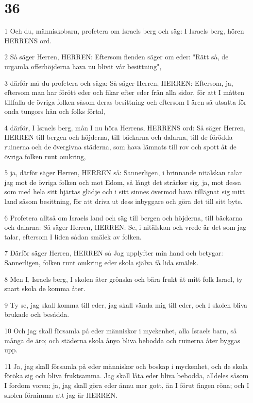 \chapter{36}

\par 1 Och du, människobarn, profetera om Israels berg och säg: I Israels berg, hören HERRENS ord.
\par 2 Så säger Herren, HERREN: Eftersom fienden säger om eder: "Rätt så, de urgamla offerhöjderna hava nu blivit vår besittning",
\par 3 därför må du profetera och säga: Så säger Herren, HERREN: Eftersom, ja, eftersom man har förött eder och fikar efter eder från alla sidor, för att I måtten tillfalla de övriga folken såsom deras besittning och eftersom I ären så utsatta för onda tungors hån och folks förtal,
\par 4 därför, I Israels berg, mån I nu höra Herrens, HERRENS ord: Så säger Herren, HERREN till bergen och höjderna, till bäckarna och dalarna, till de förödda ruinerna och de övergivna städerna, som hava lämnats till rov och spott åt de övriga folken runt omkring,
\par 5 ja, därför säger Herren, HERREN så: Sannerligen, i brinnande nitälskan talar jag mot de övriga folken och mot Edom, så långt det sträcker sig, ja, mot dessa som med hela sitt hjärtas glädje och i sitt sinnes övermod hava tillägnat sig mitt land såsom besittning, för att driva ut dess inbyggare och göra det till sitt byte.
\par 6 Profetera alltså om Israels land och säg till bergen och höjderna, till bäckarna och dalarna: Så säger Herren, HERREN: Se, i nitälskan och vrede är det som jag talar, eftersom I liden sådan smälek av folken.
\par 7 Därför säger Herren, HERREN så Jag upplyfter min hand och betygar: Sannerligen, folken runt omkring eder skola själva få lida smälek.
\par 8 Men I, Israels berg, I skolen åter grönska och bära frukt åt mitt folk Israel, ty snart skola de komma åter.
\par 9 Ty se, jag skall komma till eder, jag skall vända mig till eder, och I skolen bliva brukade och besådda.
\par 10 Och jag skall församla på eder människor i myckenhet, alla Israels barn, så många de äro; och städerna skola ånyo bliva bebodda och ruinerna åter byggas upp.
\par 11 Ja, jag skall församla på eder människor och boskap i myckenhet, och de skola föröka sig och bliva fruktsamma. Jag skall låta eder bliva bebodda, alldeles såsom I fordom voren; ja, jag skall göra eder ännu mer gott, än I förut fingen röna; och I skolen förnimma att jag är HERREN.
